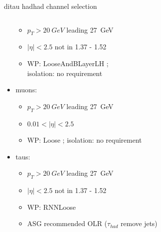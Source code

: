 \begin{frame}{\tHq ditau hadhad channel selection}
\begin{columns}
\begin{column}{0.7\textwidth}
\begin{itemize}
        \begin{itemize}
          \footnotesize
          \item $p_T>\SI{20}{GeV}$ leading \SI{27}{GeV}
          \item $|\eta|<2.5$ not in 1.37 - 1.52
          \item WP: LooseAndBLayerLH ; \\isolation: no requirement
        \end{itemize}
        \item muons:
        \vspace*{-0.02\textwidth}
        \begin{itemize}
          \footnotesize
          \item $p_T>\SI{20}{GeV}$ leading \SI{27}{GeV}
          \item $0.01<|\eta|<2.5$
          \item WP: Loose ; isolation: no requirement
        \end{itemize}
        \item taus:
        \vspace*{-0.02\textwidth}
        \begin{itemize}
          \footnotesize
          \item $p_T>\SI{20}{GeV}$ leading \SI{27}{GeV}
          \item $|\eta|<2.5$ not in 1.37 - 1.52
          \item WP: RNNLoose
          \item ASG recommended OLR ($\tau_{had}$ remove jets)
        \end{itemize}
      \end{itemize}
    \end{column}
  \end{columns}
\end{frame}
  

